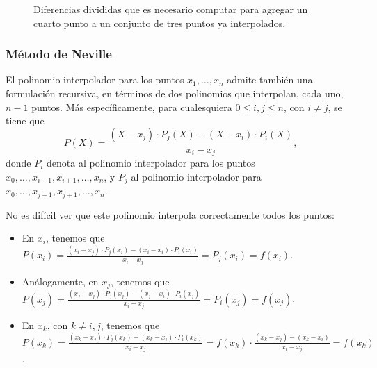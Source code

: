 \begin{figure}[H]
\begin{center}
\end{center}

\label{fig:dif-divididas}
\caption{Diferencias divididas que es necesario computar para agregar un
cuarto punto a un conjunto de tres puntos ya interpolados.}
\end{figure}

\subsubsection{Método de Neville}

El polinomio interpolador para los puntos $x_1, \dots, x_n$ admite
también una formulación recursiva, en términos de dos polinomios que
interpolan, cada uno, $n-1$ puntos. Más específicamente, para cualesquiera
$0 \leq i,j \leq n$, con $i \neq j$, se tiene que
\[ P(X) = \frac{(X - x_j) \cdot P_j(X)
    - (X - x_i) \cdot P_i(X)}{x_i - x_j}, \]
donde $P_i$ denota al polinomio interpolador para los puntos
$x_0,\dots,x_{i-1},x_{i+1},\dots,x_n$, y $P_j$ al polinomio interpolador para
$x_0,\dots,x_{j-1},x_{j+1},\dots,x_n$.

No es difícil ver que este polinomio interpola correctamente todos los puntos:
\begin{itemize}
\item En $x_i$, tenemos que $P(x_i)
    = \frac{(x_i - x_j) \cdot P_j(x_i) - (x_i - x_i) \cdot P_i(x_i)}{x_i - x_j}
    = P_j(x_i) = f(x_i)$.
\item Análogamente, en $x_j$, tenemos que $P(x_j)
    = \frac{(x_j - x_j) \cdot P_j(x_j) - (x_j - x_i) \cdot P_i(x_j)}{x_i - x_j}
    = P_i(x_j) = f(x_j)$.
\item En $x_k$, con $k \neq i, j$, tenemos que $P(x_k)
    = \frac{(x_k - x_j) \cdot P_j(x_k) - (x_k - x_i) \cdot P_i(x_k)}{x_i - x_j}
    = f(x_k) \cdot \frac{(x_k - x_j) - (x_k - x_i)}{x_i - x_j} = f(x_k)$.
\end{itemize}

